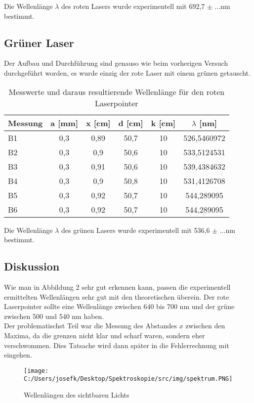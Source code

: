 Die Wellenlänge $\lambda$ des roten Lasers wurde experimentell mit 692,7 $\pm$ ...nm bestimmt.

\subsection{Grüner Laser}

Der Aufbau und Durchführung sind genauso wie beim vorherigen Versuch durchgeführt worden, es wurde einzig der rote Laser mit einem grünen getauscht.

\begin{table}[H]
	\centering
	\begin{tabular}{lccccc}
		\toprule
		Messung & a [mm] & x [cm] & d [cm] & k [cm] & $\lambda$ [nm] \\
		\midrule
		B1      & 0,3    & 0,89   & 50,7   & 10     & 526,5460972    \\
		B2      & 0,3    & 0,9    & 50,6   & 10     & 533,5124531    \\
		B3      & 0,3    & 0,91   & 50,6   & 10     & 539,4384632    \\
		B4      & 0,3    & 0,9    & 50,8   & 10     & 531,4126708    \\
		B5      & 0,3    & 0,92   & 50,7   & 10     & 544,289095     \\
		B6      & 0,3    & 0,92   & 50,7   & 10     & 544,289095     \\
		\bottomrule
	\end{tabular}
	\caption{Messwerte und daraus resultierende Wellenlänge für den roten Laserpointer}
\end{table}

Die Wellenlänge $\lambda$ des grünen Lasers wurde experimentell mit 536,6 $\pm$ ...nm bestimmt.

\subsection{Diskussion}
Wie man in Abbildung 2 sehr gut erkennen kann, passen die experimentell ermittelten Wellenlängen sehr gut mit den theoretischen überein.
Der rote Laserpointer sollte eine Wellenlänge zwischen 640 bis 700 nm und der grüne zwischen 500 und 540 nm haben.\\
Der problematischst Teil war die Messung des Abstandes $x$ zwischen den Maxima, da die grenzen nicht klar und scharf waren, sondern eher verschwommen. Dies Tatsache wird dann später in die 
Fehlerrechnung mit eingehen.   
\begin{figure}[H]
    \centering
	\texttt{[image: C:/Users/josefk/Desktop/Spektroskopie/src/img/spektrum.PNG]}
	\caption{Wellenlängen des sichtbaren Lichts}
\end{figure}
\clearpage
